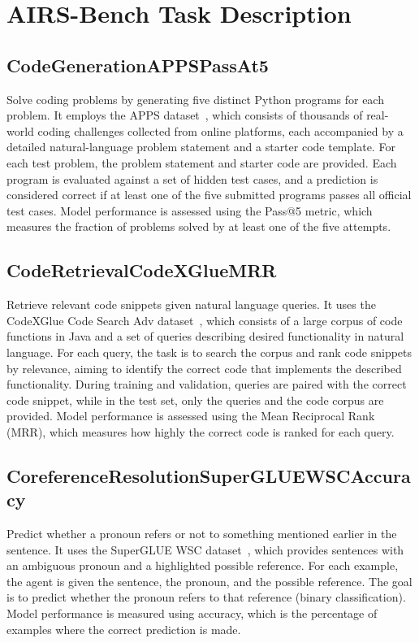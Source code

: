 \documentclass{fairmeta}
\begin{document}
\newpage

\section{AIRS-Bench Task Description}


\subsection{CodeGenerationAPPSPassAt5}

Solve coding problems by generating five distinct Python programs for each problem. It employs the APPS dataset~\citep{hendrycksapps2021}, which consists of thousands of real-world coding challenges collected from online platforms, each accompanied by a detailed natural-language problem statement and a starter code template. For each test problem, the problem statement and starter code are provided. Each program is evaluated against a set of hidden test cases, and a prediction is considered correct if at least one of the five submitted programs passes all official test cases. Model performance is assessed using the Pass@5 metric, which measures the fraction of problems solved by at least one of the five attempts.


\subsection{CodeRetrievalCodeXGlueMRR}

Retrieve relevant code snippets given natural language queries. It uses the CodeXGlue Code Search Adv dataset~\citep{lu2021codexglue}, which consists of a large corpus of code functions in Java and a set of queries describing desired functionality in natural language. For each query, the task is to search the corpus and rank code snippets by relevance, aiming to identify the correct code that implements the described functionality. During training and validation, queries are paired with the correct code snippet, while in the test set, only the queries and the code corpus are provided. Model performance is assessed using the Mean Reciprocal Rank (MRR), which measures how highly the correct code is ranked for each query.


\subsection{CoreferenceResolutionSuperGLUEWSCAccuracy}

Predict whether a pronoun refers or not to something mentioned earlier in the sentence. It uses the SuperGLUE WSC dataset~\citep{wang2019superglue}, which provides sentences with an ambiguous pronoun and a highlighted possible reference. For each example, the agent is given the sentence, the pronoun, and the possible reference. The goal is to predict whether the pronoun refers to that reference (binary classification). Model performance is measured using accuracy, which is the percentage of examples where the correct prediction is made.
\end{document}
